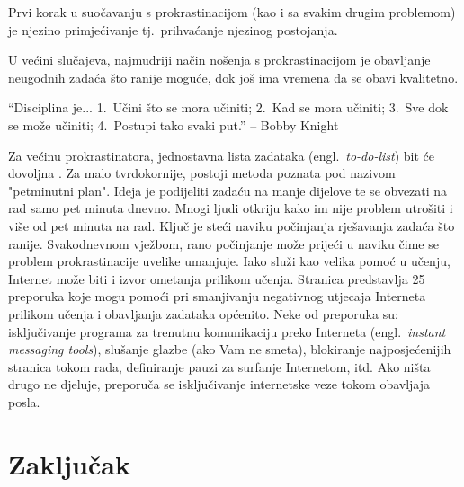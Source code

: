 \documentclass[11pt,twocolumn,english]{article}
\newcommand{\engl}[1]{(engl.~\emph{#1})}
\begin{document}
Prvi korak u suočavanju s prokrastinacijom (kao i sa svakim drugim problemom)
je njezino primjećivanje tj.~prihvaćanje njezinog postojanja. 

U većini slučajeva, najmudriji način nošenja s prokrastinacijom je obavljanje
neugodnih zadaća što ranije moguće, dok još ima vremena da se obavi kvalitetno.

``Disciplina je... 1.~Učini što se mora učiniti; 2.~Kad se mora učiniti; 3.~Sve
dok se može učiniti; 4.~Postupi tako svaki put.'' -- Bobby Knight  

Za većinu prokrastinatora, jednostavna lista zadataka \engl{to-do-list}
bit će dovoljna \cite{TuckerPsySelfHelp}. Za malo tvrdokornije, postoji metoda
poznata pod nazivom "petminutni plan". Ideja je podijeliti zadaću na manje
dijelove te se obvezati na rad samo pet minuta dnevno. Mnogi ljudi otkriju kako
im nije problem utrošiti i više od pet minuta na rad. Ključ je steći naviku
počinjanja rješavanja zadaća što ranije. Svakodnevnom vježbom, rano počinjanje
može prijeći u naviku čime se problem prokrastinacije uvelike umanjuje. Iako
služi kao velika pomoć u učenju, Internet može biti i izvor ometanja prilikom
učenja. Stranica \cite{ColDeg25ways} predstavlja 25 preporuka koje mogu pomoći
pri smanjivanju negativnog utjecaja Interneta prilikom učenja i obavljanja
zadataka općenito. Neke od preporuka su: isključivanje programa za trenutnu
komunikaciju preko Interneta \engl{instant messaging tools}, slušanje
glazbe (ako Vam ne smeta), blokiranje najposjećenijih stranica tokom rada, definiranje
pauzi za surfanje Internetom, itd. Ako ništa drugo ne djeluje, preporuča se
isključivanje internetske veze tokom obavljaja posla.

\section{Zaključak}



\end{document}
